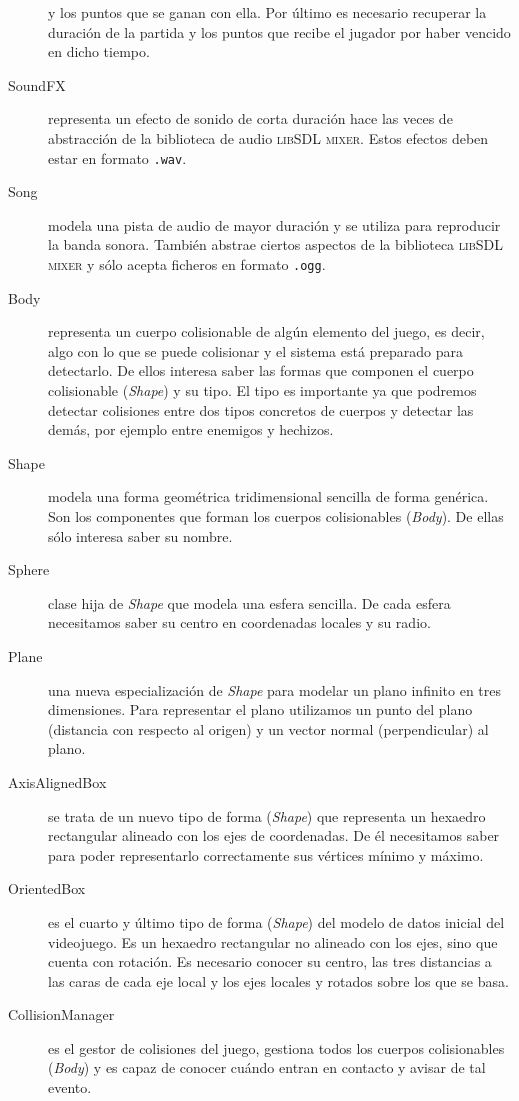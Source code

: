 \begin{description}
    y los puntos que se ganan con ella. Por último es necesario recuperar
    la duración de la partida y los puntos que recibe el jugador por haber
    vencido en dicho tiempo.
    \item [SoundFX] representa un efecto de sonido de corta duración hace
    las veces de abstracción de la biblioteca de audio \textsc{libSDL mixer}.
    Estos efectos deben estar en formato \texttt{.wav}.
    \item [Song] modela una pista de audio de mayor duración y se utiliza
    para reproducir la banda sonora. También abstrae ciertos aspectos
    de la biblioteca \textsc{libSDL mixer} y sólo acepta ficheros en formato
    \texttt{.ogg}.
    \item [Body] representa un cuerpo colisionable de algún elemento del
    juego, es decir, algo con lo que se puede colisionar y el sistema
    está preparado para detectarlo. De ellos interesa saber las formas
    que componen el cuerpo colisionable (\textit{Shape}) y su tipo. El tipo
    es importante ya que podremos detectar colisiones entre dos tipos concretos
    de cuerpos y detectar las demás, por ejemplo entre enemigos y hechizos.
    \item [Shape] modela una forma geométrica tridimensional sencilla de
    forma genérica. Son los componentes que forman los cuerpos colisionables
    (\textit{Body}). De ellas sólo interesa saber su nombre.
    \item [Sphere] clase hija de \textit{Shape} que modela una esfera sencilla.
    De cada esfera necesitamos saber su centro en coordenadas locales y
    su radio.
    \item [Plane] una nueva especialización de \textit{Shape} para modelar
    un plano infinito en tres dimensiones. Para representar el plano utilizamos
    un punto del plano (distancia con respecto al origen) y un vector normal
    (perpendicular) al plano.
    \item [AxisAlignedBox] se trata de un nuevo tipo de forma (\textit{Shape})
    que representa un hexaedro rectangular alineado con los ejes de coordenadas.
    De él necesitamos saber para poder representarlo correctamente sus vértices
    mínimo y máximo.
    \item [OrientedBox] es el cuarto y último tipo de forma (\textit{Shape})
    del modelo de datos inicial del videojuego. Es un hexaedro rectangular
    no alineado con los ejes, sino que cuenta con rotación. Es necesario
    conocer su centro, las tres distancias a las caras de cada eje local
    y los ejes locales y rotados sobre los que se basa.
    \item [CollisionManager] es el gestor de colisiones del juego, gestiona
    todos los cuerpos colisionables (\textit{Body}) y es capaz de conocer
    cuándo entran en contacto y avisar de tal evento. 
\end{description}

